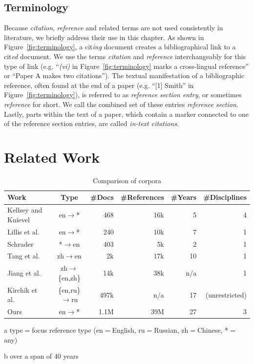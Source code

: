 \subsection*{Terminology}
Because \textit{citation}, \textit{reference} and related terms are not used consistently in literature, we briefly address their use in this chapter. As shown in Figure~\ref{fig:terminology}, a cit\emph{ing} document creates a bibliographical link to a cit\emph{ed} document. We use the terms \textit{citation} and \textit{reference} interchangeably for this type of link (e.g. ``\textit{(vi)} in Figure~\ref{fig:terminology} marks a cross-lingual reference'' or ``Paper A makes two citations''). The textual manifestation of a bibliographic reference, often found at the end of a paper (e.g. ``[1] Smith'' in Figure~\ref{fig:terminology}), is referred to as \textit{reference section entry}, or sometimes \textit{reference} for short. We call the combined set of these entries \textit{reference section}. Lastly, parts within the text of a paper, which contain a marker connected to one of the reference section entries, are called \textit{in-text citations}.

\section{Related Work}\label{sec:relwork}

\begin{table}
\caption{Comparison of corpora}
 \label{tab:relworkcomp}
  \centering
  \begin{small}
 \begin{threeparttable}
 \begin{tabular}{lcrrrr}
 \toprule
   Work & Type\tnote{a} & \#Docs & \hphantom{m}\#References & \hphantom{m}\#Years & \hphantom{nn}\#Disciplines \\
   \midrule
   Kellsey and Knievel~\cite{Kellsey2004} & en$\rightarrow$* & 468 & 16k & 5\tnote{b} & 4 \\
   Lillis et al.~\cite{Lillis2010} & en$\rightarrow$* & 240 & 10k & 7 & 1 \\
   Schrader~\cite{Schrader2019} & *$\rightarrow$en & 403 & 5k & 2 & 1 \\
   Tang et al.~\cite{Tang2014} & zh$\rightarrow$en & 2k & 17k & 10 & 1 \\
   Jiang et al.~\cite{Jiang2018,Jiang2018b} & zh$\rightarrow$\{en,zh\} & 14k & 38k & n/a & 1 \\
   Kirchik et al.~\cite{Kirchik2012} & \{en,ru\}$\rightarrow$ru & 497k & n/a & 17 & (unrestricted) \\
   Ours & en$\rightarrow$* &  1.1M & 39M & 27 & 3 \\
   \bottomrule
 \end{tabular}
 \begin{tablenotes}
    \item[a] type$=$focus reference type (en$=$English, ru$=$Russian, zh$=$Chinese, *$=$any)
    \item[b] over a span of 40 years
 \end{tablenotes}
\end{threeparttable}
  \end{small}
\end{table}

